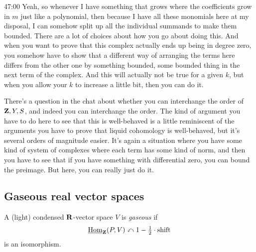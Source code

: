 \begin{unfinished}{47:00}
Yeah, so whenever I have something that grows where the coefficients grow in $m$ just like a polynomial, then because I have all these monomials here at my disposal, I can somehow split up all the individual summands to make them bounded. There are a lot of choices about how you go about doing this. And when you want to prove that this complex actually ends up being in degree zero, you somehow have to show that a different way of arranging the terms here differs from the other one by something bounded, some bounded thing in the next term of the complex. And this will actually not be true for a given $k$, but when you allow your $k$ to increase a little bit, then you can do it.

There's a question in the chat about whether you can interchange the order of $\mathbf Z , Y ,S$, and indeed you can interchange the order. The kind of argument you have to do here to see that this is well-behaved is a little reminiscent of the arguments you have to prove that liquid cohomology is well-behaved, but it's several orders of magnitude easier. It's again a situation where you have some kind of system of complexes where each term has some kind of norm, and then you have to see that if you have something with differential zero, you can bound the preimage. But here, you can really just do it.
\end{unfinished}

\subsection{\ufs Gaseous real vector spaces}

\begin{definition}
  A (light) condensed $\mathbf R$-vector space $V$ is \emph{gaseous} if
  \[ \underline{\operatorname{Hom}}_\mathbf Z(P, V) \curvearrowleft 1-\tfrac12\cdot\mathrm{shift} \]
  is an isomorphism.
\end{definition}

